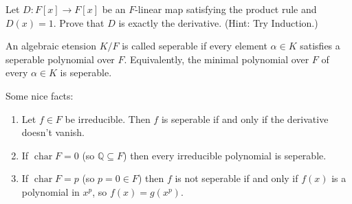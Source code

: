 \begin{exercise}
Let $D\colon F[x] \to F[x]$ be an $F$-linear map satisfying the product rule and $D(x) = 1$. Prove that $D$ is exactly the derivative. (Hint: Try Induction.)
\end{exercise}

\begin{definition}
An algebraic etension $K/F$ is called seperable if every element $\alpha \in K$ satisfies a seperable polynomial over $F$. Equivalently, the minimal polynomial over $F$ of every $\alpha \in K$ is seperable.
\end{definition}

\begin{proposition} Some nice facts:
\begin{enumerate}
\item Let $f \in F$ be irreducible. Then $f$ is seperable if and only if the derivative doesn't vanish.
\item If $\operatorname{char} F = 0$ (so $\mathbb{Q} \subseteq F$) then every irreducible polynomial is seperable.
\item If $\operatorname{char} F = p$ (so $p=0 \in F$) then $f$ is not seperable if and only if $f(x)$ is a polynomial in $x^p$, so $f(x) = g(x^p)$.
\end{enumerate}
\end{proposition}